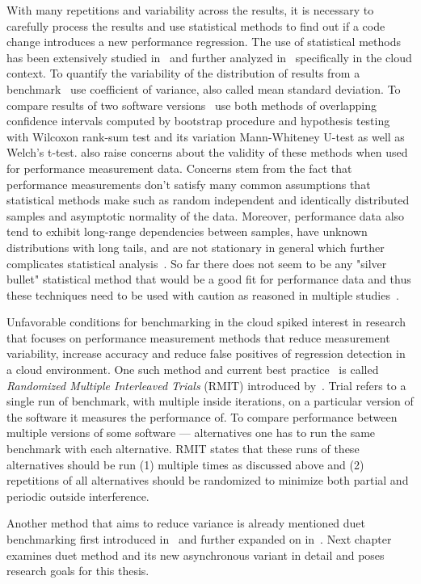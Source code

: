 With many repetitions and variability across the results, it is necessary to carefully process the results and use statistical methods to find out if a code change introduces a new performance regression.
The use of statistical methods has been extensively studied in~\citet{bulej2017stat} and further analyzed in~\citet{laaber2019software} specifically in the cloud context.
To quantify the variability of the distribution of results from a benchmark~\citet{laaber2019software} use coefficient of variance, also called mean standard deviation.
To compare results of two software versions~\citet{bulej2017stat} use both methods of overlapping confidence intervals computed by bootstrap procedure and hypothesis testing with Wilcoxon rank-sum test and its variation Mann-Whiteney U-test as well as Welch's t-test.
\citet{bulej2017stat} also raise concerns about the validity of these methods when used for performance measurement data.
Concerns stem from the fact that performance measurements don't satisfy many common assumptions that statistical methods make such as random independent and identically distributed samples and asymptotic normality of the data.
Moreover, performance data also tend to exhibit long-range dependencies between samples, have unknown distributions with long tails, and are not stationary in general which further complicates statistical analysis~\cite{bulej2017stat}.
So far there does not seem to be any "silver bullet" statistical method that would be a good fit for performance data and thus these techniques need to be used with caution as reasoned in multiple studies~\cite{leitner2016patterns, laaber2019software, bulej2017stat}.

Unfavorable conditions for benchmarking in the cloud spiked interest in research that focuses on performance measurement methods that reduce measurement variability, increase accuracy and reduce false positives of regression detection in a cloud environment.
One such method and current best practice~\cite{laaber2019software} is called \emph{Randomized Multiple Interleaved Trials} (RMIT) introduced by~\citet{abedi2017conducting}.
Trial refers to a single run of benchmark, with multiple inside iterations, on a particular version of the software it measures the performance of.
To compare performance between multiple versions of some software --- alternatives one has to run the same benchmark with each alternative.
RMIT states that these runs of these alternatives should be run (1) multiple times as discussed above and (2) repetitions of all alternatives should be randomized to minimize both partial and periodic outside interference.

Another method that aims to reduce variance is already mentioned duet benchmarking first introduced in~\citet{bulej2019initial} and further expanded on in~\citet{bulej2020duet}.
Next chapter examines duet method and its new asynchronous variant in detail and poses research goals for this thesis.
